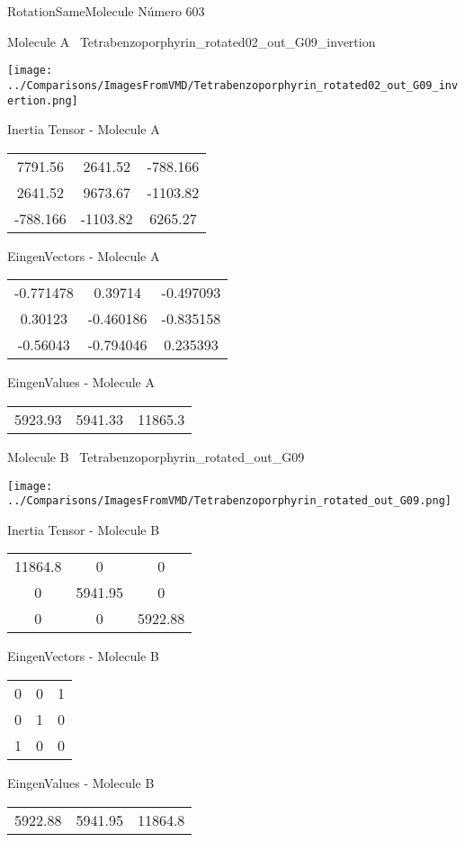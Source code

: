 \vtab[-3cm]
\begin{center}
{\large RotationSameMolecule \tab Número 603}
\end{center}
\begin{multicols}{2}
\begin{center}

Molecule A \
Tetrabenzoporphyrin\_rotated02\_out\_G09\_invertion

\texttt{[image: ../Comparisons/ImagesFromVMD/Tetrabenzoporphyrin\_rotated02\_out\_G09\_invertion.png]}

Inertia Tensor - Molecule A \\
\begin{tabular}{|c c c|}
7791.56	 & 	2641.52	 & 	-788.166	 \\
2641.52	 & 	9673.67	 & 	-1103.82	 \\
-788.166	 & 	-1103.82	 & 	6265.27
\end{tabular}

\vtab
 EingenVectors - Molecule A     \\
\begin{tabular}{|c c c|}
-0.771478	 & 	0.39714	 & 	-0.497093	 \\
0.30123	 & 	-0.460186	 & 	-0.835158	 \\
-0.56043	 & 	-0.794046	 & 	0.235393
\end{tabular}

\vtab
 EingenValues - Molecule A     \\
\begin{tabular}{|c c c|}
5923.93	 & 	5941.33	 & 	11865.3	 \\
\end{tabular}
\columnbreak

Molecule B \
Tetrabenzoporphyrin\_rotated\_out\_G09

\texttt{[image: ../Comparisons/ImagesFromVMD/Tetrabenzoporphyrin\_rotated\_out\_G09.png]}

Inertia Tensor - Molecule B \\
\begin{tabular}{|c c c|}
11864.8	 & 	0	 & 	0	 \\
0	 & 	5941.95	 & 	0	 \\
0	 & 	0	 & 	5922.88
\end{tabular}

\vtab
 EingenVectors - Molecule B     \\
\begin{tabular}{|c c c|}
0	 & 	0	 & 	1	 \\
0	 & 	1	 & 	0	 \\
1	 & 	0	 & 	0
\end{tabular}

\vtab
 EingenValues - Molecule B     \\
\begin{tabular}{|c c c|}
5922.88	 & 	5941.95	 & 	11864.8	 \\
\end{tabular}

\end{center}
\end{multicols}

